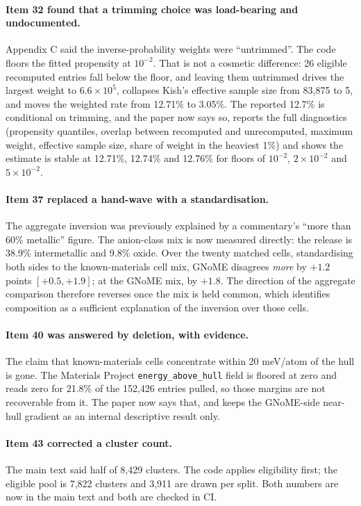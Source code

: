 \documentclass[11pt]{article}
\begin{document}
\paragraph{Item 32 found that a trimming choice was load-bearing and undocumented.} Appendix
C said the inverse-probability weights were ``untrimmed''. The code floors the fitted
propensity at $10^{-2}$. That is not a cosmetic difference: 26 eligible recomputed entries
fall below the floor, and leaving them untrimmed drives the largest weight to
$6.6\times10^{5}$, collapses Kish's effective sample size from 83{,}875 to 5, and moves the
weighted rate from 12.71\% to 3.05\%. The reported 12.7\% is conditional on trimming, and
the paper now says so, reports the full diagnostics (propensity quantiles, overlap between
recomputed and unrecomputed, maximum weight, effective sample size, share of weight in the
heaviest 1\%) and shows the estimate is stable at 12.71\%, 12.74\% and 12.76\% for floors of
$10^{-2}$, $2\times10^{-2}$ and $5\times10^{-2}$.

\paragraph{Item 37 replaced a hand-wave with a standardisation.} The aggregate inversion was
previously explained by a commentary's ``more than 60\% metallic'' figure. The anion-class
mix is now measured directly: the release is 38.9\% intermetallic and 9.8\% oxide. Over the
twenty matched cells, standardising both sides to the known-materials cell mix, GNoME
disagrees \emph{more} by $+1.2$ points $[+0.5, +1.9]$; at the GNoME mix, by $+1.8$. The
direction of the aggregate comparison therefore reverses once the mix is held common, which
identifies composition as a sufficient explanation of the inversion over those cells.

\paragraph{Item 40 was answered by deletion, with evidence.} The claim that known-materials
cells concentrate within 20 meV/atom of the hull is gone. The Materials Project
\texttt{energy\_above\_hull} field is floored at zero and reads zero for 21.8\% of the
152{,}426 entries pulled, so those margins are not recoverable from it. The paper now says
that, and keeps the GNoME-side near-hull gradient as an internal descriptive result only.

\paragraph{Item 43 corrected a cluster count.} The main text said half of 8{,}429 clusters.
The code applies eligibility first; the eligible pool is 7{,}822 clusters and 3{,}911 are
drawn per split. Both numbers are now in the main text and both are checked in CI.
\end{document}
